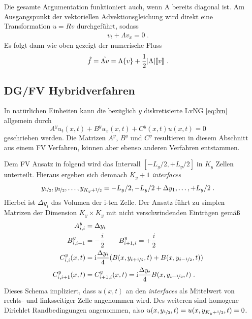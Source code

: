 Die gesamte Argumentation funktioniert auch, wenn A bereits diagonal ist. Am Ausgangspunkt der vektoriellen Advektionsgleichung wird direkt eine Transformation $u=Rv$ durchgeführt, sodass
\begin{align}
  v_t + \Lambda v_x = 0 \; .
\end{align}
Es folgt dann wie oben gezeigt der numerische Fluss
\begin{align}
  \hat{f} = \hat{\Lambda v} = \Lambda\{ v \} + \frac{1}{2}|\Lambda|\llbracket v \rrbracket \; .
  \label{eq:FLUX}
\end{align}


\subsection{DG/FV Hybridverfahren}\label{sec:Hybridverfahren}
In natürlichen Einheiten kann die bezüglich $y$ diskretisierte LvNG \eqref{eq:lvn} allgemein durch
\begin{equation}
  {A}^y u_t(x,t) + {B}^y u_x(x,t) + {C}^y(x,t)u(x,t) = 0
  \label{eq:qschema}
\end{equation}
geschrieben werden. Die Matrizen  ${A}^y$, ${B}^y$ und ${C}^y$ resultieren in diesem Abschnitt aus einem FV Verfahren, können aber ebenso anderen Verfahren entstammen.

Dem FV Ansatz in \cite{lukas1} folgend wird das Intervall ${[-L_y/2,+L_y/2]}$ in $K_y$ Zellen unterteilt. Hieraus ergeben sich demnach $K_y+1$ \emph{interfaces}
\begin{equation*}
  {y_{\nicefrac{1}{2}}, y_{\nicefrac{3}{2}}, \dots, y_{K_y + \nicefrac{1}{2}} = -L_y/2, -L_y/2+\Delta y_1,\dots,+L_y/2} \; .
\end{equation*}
Hierbei ist $\Delta y_i$ das Volumen der i-ten Zelle. Der Ansatz führt zu simplen Matrizen der Dimension ${K_y\times K_y}$ mit nicht verschwindenden Einträgen gemäß
\begin{equation}
  \begin{aligned}
  {A}^y_{i,i} &= \Delta y_i \\
  {B}^y_{i,i+1} &= -\frac{i}{2} \qquad
  {B}^y_{i+1, i} = +\frac{i}{2}  \\
  {C}^y_{i,i}(x,t) &= \mathrm{i} \frac{\Delta y_i}{4} (B(x, y_{i+\nicefrac{1}{2}},t) + B(x, y_{i-\nicefrac{1}{2}},t))  \\
  {C}^y_{i,i+1}(x,t) &= C^y_{i+1,i}(x,t) = \mathrm{i} \frac{\Delta y_i}{4} B(x, y_{i+\nicefrac{1}{2}},t)  \; .
  \end{aligned}
\end{equation}
Dieses Schema impliziert, dass $u(x,t)$ an den \emph{interfaces} als Mittelwert von rechts- und linksseitiger Zelle angenommen wird. Des weiteren sind  homogene Dirichlet Randbedingungen angenommen, also ${u(x,y_{\nicefrac{1}{2}}, t) = u(x,y_{K_y+\nicefrac{1}{2}}, t) = 0}$.

